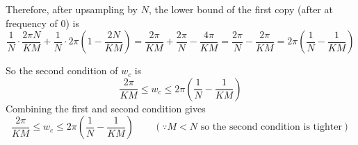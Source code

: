 \begin{enumerate}[(a)]
Therefore, after upsampling by $N$, the lower bound of the first copy (after at frequency of 0) is
\[\frac{1}{N} \cdot \frac{2\pi N}{KM} + \frac{1}{N}\cdot 2\pi(1-\frac{2N}{KM}) = \frac{2\pi}{KM} + \frac{2\pi}{N} - \frac{4\pi}{KM} = \frac{2\pi}{N} - \frac{2\pi}{KM} = 2\pi(\frac{1}{N} - \frac{1}{KM})\]

So the second condition of $w_c$ is
\[ \frac{2\pi}{KM} \leq w_c \leq 2\pi(\frac{1}{N} - \frac{1}{KM}) \]
Combining the first and second condition gives
\[ \frac{2\pi}{KM} \leq w_c \leq 2\pi(\frac{1}{N} - \frac{1}{KM}) \qquad (\because M<N\text{ so the second condition is tighter})\]
\end{enumerate}